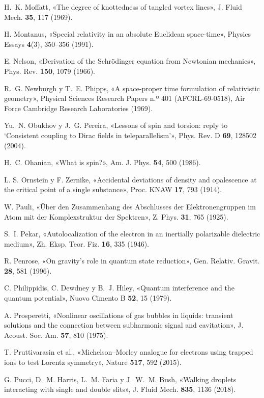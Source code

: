 \documentclass[11pt,a4paper]{article}
\begin{document}
\begin{list}{}{\setlength{\leftmargin}{1.5em}\setlength{\itemindent}{-1.5em}\setlength{\itemsep}{0.15em}\small}
\item H.~K. Moffatt, «The degree of knottedness of tangled vortex lines», J. Fluid Mech. \textbf{35}, 117 (1969).
\item H. Montanus, «Special relativity in an absolute Euclidean space-time», Physics Essays \textbf{4}(3), 350--356 (1991).
\item E. Nelson, «Derivation of the Schrödinger equation from Newtonian mechanics», Phys. Rev. \textbf{150}, 1079 (1966).
\item R.~G. Newburgh y T.~E. Phipps, «A space-proper time formulation of relativistic geometry», Physical Sciences Research Papers n.º 401 (AFCRL-69-0518), Air Force Cambridge Research Laboratories (1969).
\item Yu.~N. Obukhov y J.~G. Pereira, «Lessons of spin and torsion: reply to ‘Consistent coupling to Dirac fields in teleparallelism’», Phys. Rev. D \textbf{69}, 128502 (2004).
\item H.~C. Ohanian, «What is spin?», Am. J. Phys. \textbf{54}, 500 (1986).
\item L. S. Ornstein y F. Zernike, «Accidental deviations of density and opalescence at the critical point of a single substance», Proc. KNAW \textbf{17}, 793 (1914).
\item W. Pauli, «Über den Zusammenhang des Abschlusses der Elektronengruppen im Atom mit der Komplexstruktur der Spektren», Z. Phys. \textbf{31}, 765 (1925).
\item S.~I. Pekar, «Autolocalization of the electron in an inertially polarizable dielectric medium», Zh. Eksp. Teor. Fiz. \textbf{16}, 335 (1946).
\item R. Penrose, «On gravity's role in quantum state reduction», Gen. Relativ. Gravit. \textbf{28}, 581 (1996).
\item C. Philippidis, C. Dewdney y B.~J. Hiley, «Quantum interference and the quantum potential», Nuovo Cimento B \textbf{52}, 15 (1979).
\item A. Prosperetti, «Nonlinear oscillations of gas bubbles in liquids: transient solutions and the connection between subharmonic signal and cavitation», J. Acoust. Soc. Am. \textbf{57}, 810 (1975).
\item T. Pruttivarasin et al., «Michelson--Morley analogue for electrons using trapped ions to test Lorentz symmetry», Nature \textbf{517}, 592 (2015).
\item G. Pucci, D.~M. Harris, L.~M. Faria y J.~W.~M. Bush, «Walking droplets interacting with single and double slits», J. Fluid Mech. \textbf{835}, 1136 (2018).

\end{list}
\end{document}
